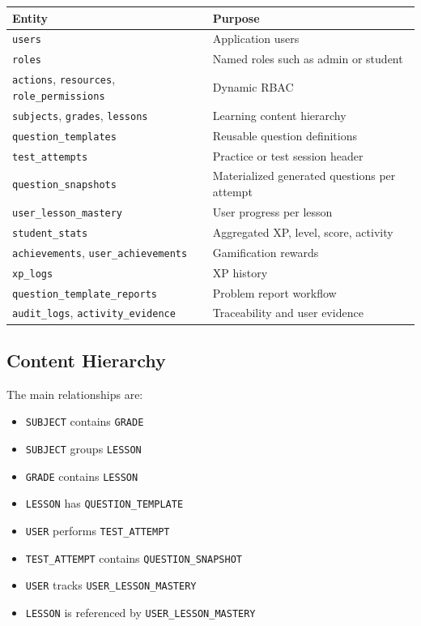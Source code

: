 \documentclass[11pt,a4paper]{article}
\newcommand{\docpath}[1]{\texttt{#1}}
\begin{document}
\begin{longtable}{L{0.28\textwidth}L{0.62\textwidth}}
\toprule
\textbf{Entity} & \textbf{Purpose} \\
\midrule
\endhead
\docpath{users} & Application users \\
\docpath{roles} & Named roles such as admin or student \\
\docpath{actions}, \docpath{resources}, \docpath{role\_permissions} & Dynamic RBAC \\
\docpath{subjects}, \docpath{grades}, \docpath{lessons} & Learning content hierarchy \\
\docpath{question\_templates} & Reusable question definitions \\
\docpath{test\_attempts} & Practice or test session header \\
\docpath{question\_snapshots} & Materialized generated questions per attempt \\
\docpath{user\_lesson\_mastery} & User progress per lesson \\
\docpath{student\_stats} & Aggregated XP, level, score, activity \\
\docpath{achievements}, \docpath{user\_achievements} & Gamification rewards \\
\docpath{xp\_logs} & XP history \\
\docpath{question\_template\_reports} & Problem report workflow \\
\docpath{audit\_logs}, \docpath{activity\_evidence} & Traceability and user evidence \\
\bottomrule
\end{longtable}

\subsection{Content Hierarchy}

The main relationships are:
\begin{itemize}[leftmargin=1.5em]
  \item \docpath{SUBJECT} contains \docpath{GRADE}
  \item \docpath{SUBJECT} groups \docpath{LESSON}
  \item \docpath{GRADE} contains \docpath{LESSON}
  \item \docpath{LESSON} has \docpath{QUESTION\_TEMPLATE}
  \item \docpath{USER} performs \docpath{TEST\_ATTEMPT}
  \item \docpath{TEST\_ATTEMPT} contains \docpath{QUESTION\_SNAPSHOT}
  \item \docpath{USER} tracks \docpath{USER\_LESSON\_MASTERY}
  \item \docpath{LESSON} is referenced by \docpath{USER\_LESSON\_MASTERY}
\end{itemize}
\end{document}
